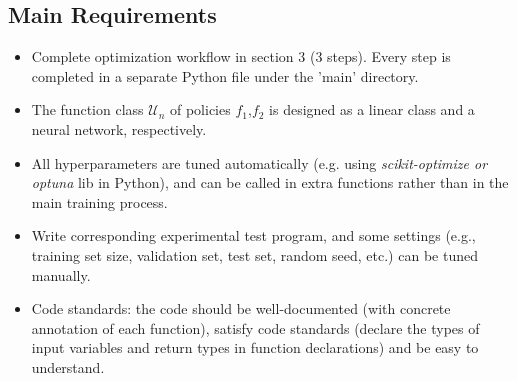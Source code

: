\documentclass[10pt]{article}
\theoremstyle{remark} \newtheorem{rem}{Remark}
\begin{document}
\subsection{Main Requirements}
\begin{itemize}
    \item Complete optimization workflow in section 3 (3 steps). Every step is completed in a separate Python file under the 'main' directory.
    \item The function class $\mathcal U_n$ of policies $f_1$,$f_2$ is designed as a linear class and a neural network, respectively.
    \item All hyperparameters are tuned automatically (e.g. using \textit{scikit-optimize or optuna} lib in Python), and can be called in extra functions rather than in the main training process.
    \item Write corresponding experimental test program, and some settings (e.g., training set size, validation set, test set, random seed, etc.) can be tuned manually.
    \item Code standards: the code should be well-documented (with concrete annotation of each function), satisfy code standards (declare the types of input variables and return types in function declarations) and be easy to understand.
\end{itemize}
\end{document}
